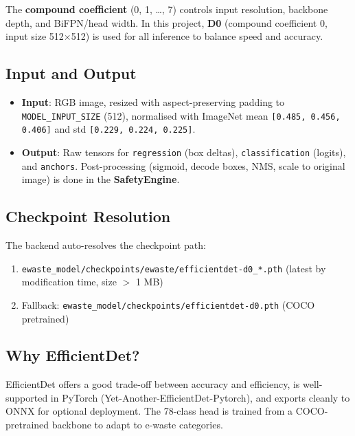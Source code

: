 \documentclass[11pt,a4paper]{article}
\begin{document}
The \textbf{compound coefficient} (0, 1, \ldots, 7) controls input resolution, backbone depth, and BiFPN/head width. In this project, \textbf{D0} (compound coefficient 0, input size 512$\times$512) is used for all inference to balance speed and accuracy.

\subsection{Input and Output}

\begin{itemize}
    \item \textbf{Input}: RGB image, resized with aspect-preserving padding to \texttt{MODEL\_INPUT\_SIZE} (512), normalised with ImageNet mean \texttt{[0.485, 0.456, 0.406]} and std \texttt{[0.229, 0.224, 0.225]}.
    \item \textbf{Output}: Raw tensors for \texttt{regression} (box deltas), \texttt{classification} (logits), and \texttt{anchors}. Post-processing (sigmoid, decode boxes, NMS, scale to original image) is done in the \textbf{SafetyEngine}.
\end{itemize}

\subsection{Checkpoint Resolution}

The backend auto-resolves the checkpoint path:

\begin{enumerate}
    \item \texttt{ewaste\_model/checkpoints/ewaste/efficientdet-d0\_*.pth} (latest by modification time, size $>$ 1 MB)
    \item Fallback: \texttt{ewaste\_model/checkpoints/efficientdet-d0.pth} (COCO pretrained)
\end{enumerate}

\subsection{Why EfficientDet?}

EfficientDet offers a good trade-off between accuracy and efficiency, is well-supported in PyTorch (Yet-Another-EfficientDet-Pytorch), and exports cleanly to ONNX for optional deployment. The 78-class head is trained from a COCO-pretrained backbone to adapt to e-waste categories.

\end{document}
